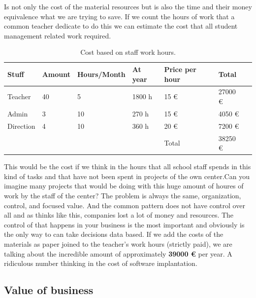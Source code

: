 Is not only the cost of the material resources but is also the time and their money
equivalence what we are trying to save.  If we count the hours of work that a
common teacher dedicate to do this we can estimate the cost that all student
management related work required.

\begin{table}[H]
\centering

\begin{tabular}{@{}lllllll@{}}

Stuff & Amount & Hours/Month & At year & Price per hour & Total  \\
\midrule

Teacher     & 40 & 5    & 1800 h   & 15 \euro  & 27000  \euro  \\
Admin       & 3  & 10   & 270 h   & 15 \euro  & 4050   \euro  \\
Direction   & 4  & 10   & 360 h   & 20 \euro  & 7200   \euro  \\

\midrule
& & & & Total & 38250 \euro \\
\end{tabular}
\caption{Cost based on staff work hours.}
\label{my-label}
\end{table}

\noindent This would be the cost if we think in the hours that all school staff spends
in this kind of tasks and that have not been spent in projects of the own
center.Can you imagine many projects that would be doing with this huge
amount of houres of work by the staff of the center?
\intro
The problem is always the same, organization, control, and focused value. And
the common pattern does not have control over all and as thinks like this,
companies lost a lot of money and resources. The control of that happens in your
business is the most important and obviously is the only way to can take
decisions data based.
\intro
If we add the costs of the materials as paper joined to the teacher's work hours
(strictly paid), we are talking about the incredible amount of approximately
\textbf{39000 \euro} per year. A ridiculous number thinking in the cost of
software implantation.

\subsection{Value of business}

